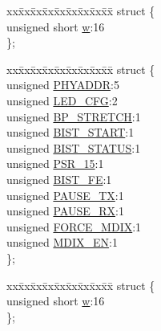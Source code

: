 \begin{DoxyCompactItemize}
\begin{tabbing}
\end{tabbing}\item 
\begin{tabbing}
xx\=xx\=xx\=xx\=xx\=xx\=xx\=xx\=xx\=\kill
struct \{\\
\>unsigned short \hyperlink{union_____p_h_y_c_t_r_lbits__t_a160850a4684a3e82c2323033964f2e98}{w}:16\\
\}; \\

\end{tabbing}\item 
\begin{tabbing}
xx\=xx\=xx\=xx\=xx\=xx\=xx\=xx\=xx\=\kill
struct \{\\
\>unsigned \hyperlink{union_____p_h_y_c_t_r_lbits__t_a4a51675b3f1a91ed3427a311fadb0f95}{PHYADDR}:5\\
\>unsigned \hyperlink{union_____p_h_y_c_t_r_lbits__t_a82dd39bbcd32e1e7365136884d962219}{LED\_CFG}:2\\
\>unsigned \hyperlink{union_____p_h_y_c_t_r_lbits__t_a6e2fc081657adb88ec35adca60b26f59}{BP\_STRETCH}:1\\
\>unsigned \hyperlink{union_____p_h_y_c_t_r_lbits__t_af0cf5692015bec08a0f9573a5b1e31a5}{BIST\_START}:1\\
\>unsigned \hyperlink{union_____p_h_y_c_t_r_lbits__t_aa2441b02968e26802be8c27fe13b2670}{BIST\_STATUS}:1\\
\>unsigned \hyperlink{union_____p_h_y_c_t_r_lbits__t_a8e23e3592770577bea4fb8233543f651}{PSR\_15}:1\\
\>unsigned \hyperlink{union_____p_h_y_c_t_r_lbits__t_a163b6a7bcb1fcbc1d1031b2bea863558}{BIST\_FE}:1\\
\>unsigned \hyperlink{union_____p_h_y_c_t_r_lbits__t_af25af8b9e750728b4b6df8c50b30558a}{PAUSE\_TX}:1\\
\>unsigned \hyperlink{union_____p_h_y_c_t_r_lbits__t_a52bf3c25d68cf73955ef6fcdc2195995}{PAUSE\_RX}:1\\
\>unsigned \hyperlink{union_____p_h_y_c_t_r_lbits__t_ab098e1df2ec30fe7609da13ae5529f5c}{FORCE\_MDIX}:1\\
\>unsigned \hyperlink{union_____p_h_y_c_t_r_lbits__t_ab76ff99cb6cc0595d87d68e0266d703a}{MDIX\_EN}:1\\
\}; \\

\end{tabbing}\item 
\begin{tabbing}
xx\=xx\=xx\=xx\=xx\=xx\=xx\=xx\=xx\=\kill
struct \{\\
\>unsigned short \hyperlink{union_____p_h_y_c_t_r_lbits__t_a160850a4684a3e82c2323033964f2e98}{w}:16\\
\}; \\


\end{tabbing}
\end{DoxyCompactItemize}
